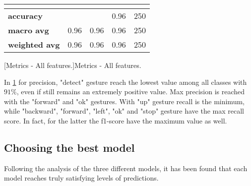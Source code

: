 \begin{table}[h]
\begin{tabular}{|lllll|}
        \multicolumn{5}{|l|}{}                                                                                                                                                                   \\ \hline
        \multicolumn{1}{|l|}{\textbf{accuracy}}     & \multicolumn{2}{l|}{}                                                          & \multicolumn{1}{l|}{0.96}              & 250              \\ \hline
        \multicolumn{1}{|l|}{\textbf{macro avg}}    & \multicolumn{1}{l|}{0.96}               & \multicolumn{1}{l|}{0.96}            & \multicolumn{1}{l|}{0.96}              & 250              \\ \hline
        \multicolumn{1}{|l|}{\textbf{weighted avg}} & \multicolumn{1}{l|}{0.96}               & \multicolumn{1}{l|}{0.96}            & \multicolumn{1}{l|}{0.96}              & 250              \\ \hline
    \end{tabular}
	[Metrics - All features.]{Metrics - All features.}
    \label{tab:featuresall}
\end{table}

\noindent In \ref{tab:featuresall} for precision, "detect" gesture reach the lowest value among all classes with $91\%$, even if still remains an extremely positive value. Max precision is reached with the "forward" and "ok" gestures. With "up" gesture recall is the minimum, while "backward", "forward", "left", "ok" and "stop" gesture have the max recall score. In fact, for the latter the f1-score have the maximum value as well.

\subsection{Choosing the best model}
\label{subsec:choosingthebest}
Following the analysis of the three different models, it has been found that each model reaches truly satisfying levels of predictions. \\

